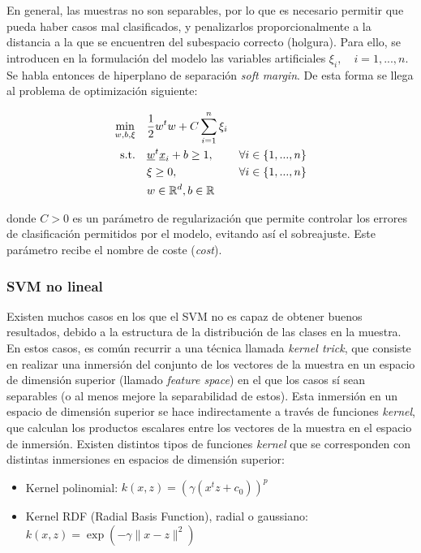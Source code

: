 \documentclass[12pt,a4paper,]{book}
\providecommand{\tightlist}{%
  \setlength{\itemsep}{0pt}\setlength{\parskip}{0pt}}
\numberwithin{dummy}{section}
\theoremstyle{ocrenumbox}
\theoremstyle{blacknumex}
\theoremstyle{blacknumbox}
\theoremstyle{ocrenum}
\theoremstyle{ocrenum}
\begin{document}
En general, las muestras no son separables, por lo que es necesario
permitir que pueda haber casos mal clasificados, y penalizarlos
proporcionalmente a la distancia a la que se encuentren del subespacio
correcto (holgura). Para ello, se introducen en la formulación del
modelo las variables artificiales \(\xi_i,\quad i=1,...,n\). Se habla
entonces de hiperplano de separación \emph{soft margin}. De esta forma
se llega al problema de optimización siguiente:

\begin{equation}
\begin{aligned}
\min_{w,b,\xi} \quad & \frac{1}{2}w^{t}w+C\sum_{i=1}^{n}{\xi_{i}}\\
\textrm{s.t.} \quad & \underline w^t \underline x_i+b \ge 1, \quad & \forall i\in \{1,...,n\}\\
  &\xi\geq0,   \quad & \forall i\in \{1,...,n\} \\
  & w \in \mathbb{R}^d, \space b \in \mathbb{R} \\
\end{aligned}
\end{equation}

donde \(C>0\) es un parámetro de regularización que permite controlar
los errores de clasificación permitidos por el modelo, evitando así el
sobreajuste. Este parámetro recibe el nombre de coste (\emph{cost}).

\hypertarget{svm-no-lineal}{%
\subsubsection{SVM no lineal}\label{svm-no-lineal}}

Existen muchos casos en los que el SVM no es capaz de obtener buenos
resultados, debido a la estructura de la distribución de las clases en
la muestra. En estos casos, es común recurrir a una técnica llamada
\emph{kernel trick}, que consiste en realizar una inmersión del conjunto
de los vectores de la muestra en un espacio de dimensión superior
(llamado \emph{feature space}) en el que los casos sí sean separables (o
al menos mejore la separabilidad de estos). Esta inmersión en un espacio
de dimensión superior se hace indirectamente a través de funciones
\emph{kernel}, que calculan los productos escalares entre los vectores
de la muestra en el espacio de inmersión. Existen distintos tipos de
funciones \emph{kernel} que se corresponden con distintas inmersiones en
espacios de dimensión superior:

\begin{itemize}
\tightlist
\item
  Kernel polinomial: \(k(x,z) = \left( \gamma(x^tz + c_0) \right)^p\)
\item
  Kernel RDF (Radial Basis Function), radial o gaussiano:
  \(k(x,z) = \exp(-\gamma \| x-z\|^2)\)
\end{itemize}
\end{document}
